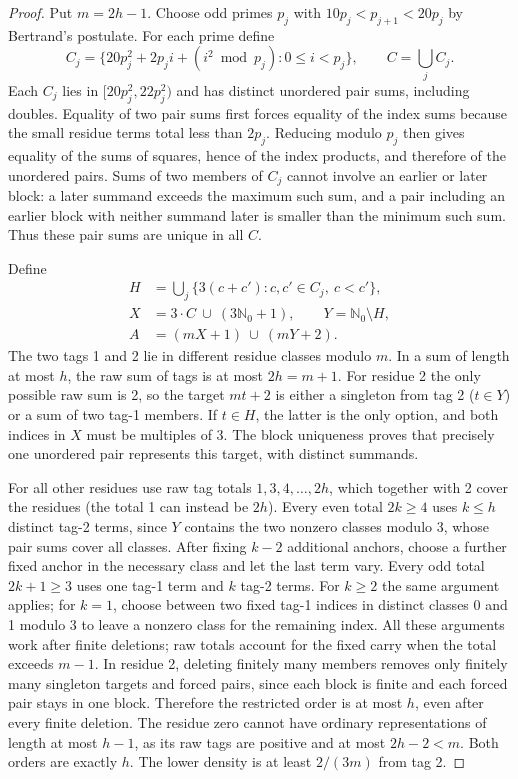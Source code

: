 \documentclass[11pt]{article}
\theoremstyle{remark}\newtheorem{remark}[theorem]{Remark}
\newcommand{\N}{\mathbb N_0}
\begin{document}
\begin{proof}
Put $m=2h-1$. Choose odd primes $p_j$ with $10p_j<p_{j+1}<20p_j$ by Bertrand's postulate. For each prime define
\[C_j=\{20p_j^2+2p_j i+(i^2\bmod p_j):0\le i<p_j\},\qquad C=\bigcup_j C_j.\]
Each $C_j$ lies in $[20p_j^2,22p_j^2)$ and has distinct unordered pair sums, including doubles. Equality of two pair sums first forces equality of the index sums because the small residue terms total less than $2p_j$. Reducing modulo $p_j$ then gives equality of the sums of squares, hence of the index products, and therefore of the unordered pairs. Sums of two members of $C_j$ cannot involve an earlier or later block: a later summand exceeds the maximum such sum, and a pair including an earlier block with neither summand later is smaller than the minimum such sum. Thus these pair sums are unique in all $C$.

Define
\begin{align*}
 H&=\bigcup_j\{3(c+c'):c,c'\in C_j,\ c<c'\},\\
 X&=3\cdot C\ \cup\ (3\N+1),\qquad Y=\N\setminus H,\\
 A&=(mX+1)\ \cup\ (mY+2).
\end{align*}
The two tags 1 and 2 lie in different residue classes modulo $m$. In a sum of length at most $h$, the raw sum of tags is at most $2h=m+1$. For residue 2 the only possible raw sum is 2, so the target $mt+2$ is either a singleton from tag 2 ($t\in Y$) or a sum of two tag-1 members. If $t\in H$, the latter is the only option, and both indices in $X$ must be multiples of 3. The block uniqueness proves that precisely one unordered pair represents this target, with distinct summands.

For all other residues use raw tag totals $1,3,4,\ldots,2h$, which together with 2 cover the residues (the total 1 can instead be $2h$). Every even total $2k\ge4$ uses $k\le h$ distinct tag-2 terms, since $Y$ contains the two nonzero classes modulo 3, whose pair sums cover all classes. After fixing $k-2$ additional anchors, choose a further fixed anchor in the necessary class and let the last term vary. Every odd total $2k+1\ge3$ uses one tag-1 term and $k$ tag-2 terms. For $k\ge2$ the same argument applies; for $k=1$, choose between two fixed tag-1 indices in distinct classes 0 and 1 modulo 3 to leave a nonzero class for the remaining index. All these arguments work after finite deletions; raw totals account for the fixed carry when the total exceeds $m-1$. In residue 2, deleting finitely many members removes only finitely many singleton targets and forced pairs, since each block is finite and each forced pair stays in one block. Therefore the restricted order is at most $h$, even after every finite deletion. The residue zero cannot have ordinary representations of length at most $h-1$, as its raw tags are positive and at most $2h-2<m$. Both orders are exactly $h$. The lower density is at least $2/(3m)$ from tag 2.


\end{proof}
\end{document}

